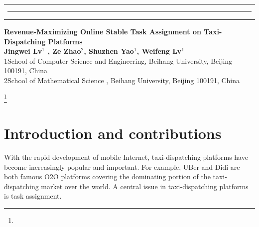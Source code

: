 \documentclass[color,twoside,amssymb,twocolumn]{article}
\newcommand{\titlename}{\bf Revenue-Maximizing Online Stable Task Assignment on Taxi-Dispatching Platforms}
\newcommand{\authorname}{Jingwei Lv$^{1}$ , Ze Zhao$^{2}$, Shuzhen Yao$^{1}$, Weifeng Lv$^{1}$}
\begin{document}
\thispagestyle{first}
\setcounter{page}{1}




\begin{tabular*}{\textwidth}{l}
 \hspace*{-6.1mm}\includegraphics{xian.eps}\vspace{-6.4mm}\\
 \hspace*{-6mm}\colorbox{lightblue}{
\arraycolsep=132pt \normalsize\hspace*{-10mm}{\color[cmyk]{.0, 0.0, 0, .0}$\begin{array}{l}\\[-3.5mm]\bf \hspace*{-37mm}
RESEARCH~ARTICLE
\end{array}$}}\vspace{-2mm}\\
\end{tabular*}



\begin{strip}
\begin{center}
{\tfont \LARGE \titlename}\\[6mm]
{\bf \authorname}\\[3mm]
\normalsize{1\quad School of Computer Science and Engineering, Beihang University, Beijing 100191, China}\\
\normalsize{2\quad School of Mathematical Science , Beihang University, Beijing 100191, China}
\end{center}
\cnote
\end{strip}

\footnote{\footname}\\


\section{Introduction and contributions}

\noindent With the rapid development of mobile Internet, taxi-dispatching platforms have become increasingly popular and important. For example, UBer and Didi are both famous O2O platforms covering the dominating portion of the taxi-dispatching market over the world. A central issue in taxi-dispatching platforms is task assignment.
\end{document}
